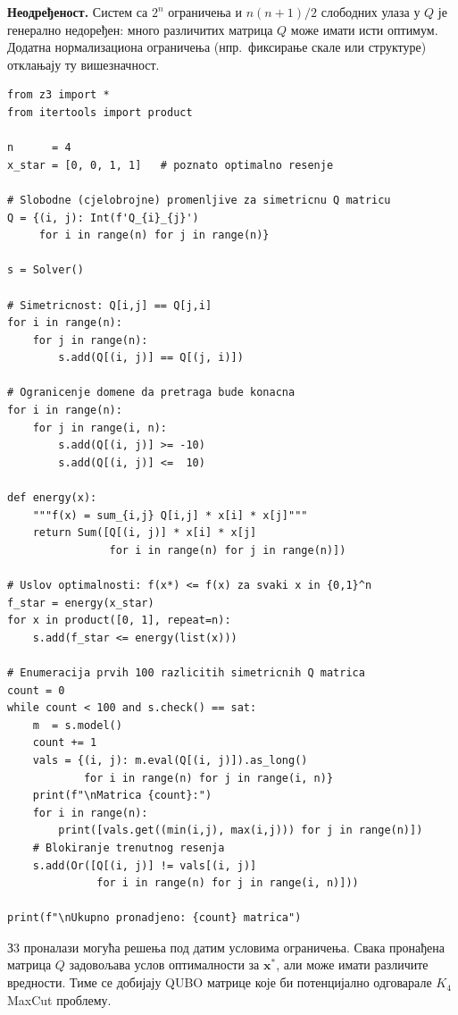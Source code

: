 \textbf{Неодређеност.}
Систем са $2^n$ ограничења и $n(n+1)/2$ слободних улаза у $Q$ је
генерално недоређен: много различитих матрица $Q$ може имати исти
оптимум. Додатна нормализациона ограничења (нпр.\ фиксирање скале
или структуре) отклањају ту вишезначност.

\begin{example}
\begin{lstlisting}[style=python, caption={Z3 реконструкција QUBO матрице из познатог оптималног решења.}]
from z3 import *
from itertools import product

n      = 4
x_star = [0, 0, 1, 1]   # poznato optimalno resenje

# Slobodne (cjelobrojne) promenljive za simetricnu Q matricu
Q = {(i, j): Int(f'Q_{i}_{j}')
     for i in range(n) for j in range(n)}

s = Solver()

# Simetricnost: Q[i,j] == Q[j,i]
for i in range(n):
    for j in range(n):
        s.add(Q[(i, j)] == Q[(j, i)])

# Ogranicenje domene da pretraga bude konacna
for i in range(n):
    for j in range(i, n):
        s.add(Q[(i, j)] >= -10)
        s.add(Q[(i, j)] <=  10)

def energy(x):
    """f(x) = sum_{i,j} Q[i,j] * x[i] * x[j]"""
    return Sum([Q[(i, j)] * x[i] * x[j]
                for i in range(n) for j in range(n)])

# Uslov optimalnosti: f(x*) <= f(x) za svaki x in {0,1}^n
f_star = energy(x_star)
for x in product([0, 1], repeat=n):
    s.add(f_star <= energy(list(x)))

# Enumeracija prvih 100 razlicitih simetricnih Q matrica
count = 0
while count < 100 and s.check() == sat:
    m  = s.model()
    count += 1
    vals = {(i, j): m.eval(Q[(i, j)]).as_long()
            for i in range(n) for j in range(i, n)}
    print(f"\nMatrica {count}:")
    for i in range(n):
        print([vals.get((min(i,j), max(i,j))) for j in range(n)])
    # Blokiranje trenutnog resenja
    s.add(Or([Q[(i, j)] != vals[(i, j)]
              for i in range(n) for j in range(i, n)]))

print(f"\nUkupno pronadjeno: {count} matrica")
\end{lstlisting}
\end{example}

З3 проналази могућа решења под датим условима ограничења. Свака пронађена матрица $Q$
задовољава услов оптималности за $\mathbf{x}^*$, али може имати различите вредности.
Тиме се добијају QUBO матрице које би потенцијално одговарале $K_4$ MaxCut проблему.

